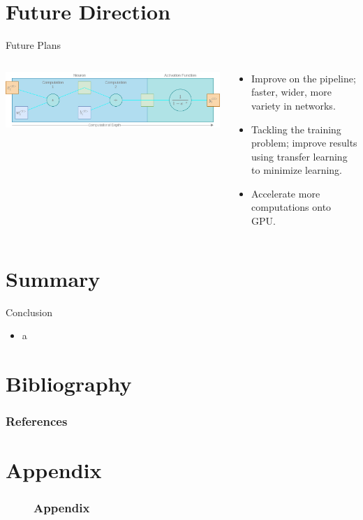 \documentclass[aspectratio=169]{beamer}
\begin{document}
  \section{Future Direction}

    \begin{frame}{Future Plans}
      \begin{columns}
        \begin{column}{0.5\textwidth}
          \includegraphics[width=1\linewidth]{neuron.png}
        \end{column}
        \begin{column}{0.5\textwidth}
          \begin{itemize}
            \item Improve on the pipeline; faster, wider, more variety in networks.
            \item Tackling the training problem; improve results using  transfer learning to minimize learning.
            \item Accelerate more computations onto GPU.
          \end{itemize}
        \end{column}
      \end{columns}
    \end{frame}

  \section{Summary}

    \begin{frame}{Conclusion}
      \begin{itemize}
        \item a
      \end{itemize}
    \end{frame}

  \section{Bibliography}

    \begin{frame}[allowframebreaks]
      \frametitle{References}
      
    \end{frame}

  \section{Appendix}

    \begin{figure}[allowframebreaks]
      \frametitle{Appendix}
    \end{figure}
\end{document}

